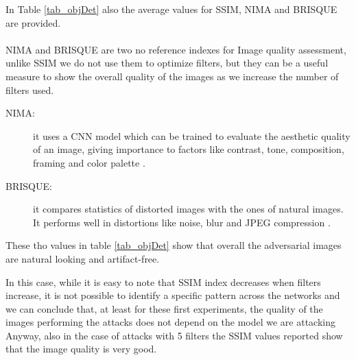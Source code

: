 \begin{table}[H]
\end{table}
In Table \ref{tab_objDet} also the average values for SSIM, NIMA and BRISQUE are provided. \\ \\
\noindent NIMA and BRISQUE are two no reference indexes for Image quality assessment, unlike SSIM we do not use them to optimize filters, but they can be a useful measure to show the overall quality of the images as we increase the number of filters used.

\begin{description}
\item[NIMA:] it uses a CNN model which can be trained to evaluate the aesthetic quality of an image, giving importance to factors like contrast, tone, composition, framing and color palette \cite{NIMA}.
\item[BRISQUE:] it compares statistics of distorted images with the ones of  natural images. It performs well in distortions like noise, blur and JPEG compression \cite{brisque}.
\end{description}

These tho values in table \ref{tab_objDet} show that overall the adversarial images are natural looking and artifact-free.

In this case, while it is easy to note that SSIM index decreases when filters increase, it is not possible to identify a specific pattern across the networks and we can conclude that, at least for these first experiments, the quality of the images performing the attacks does not depend on the model we are attacking
Anyway, also in the case of attacks with 5 filters the SSIM values reported show that the image quality is very good.

